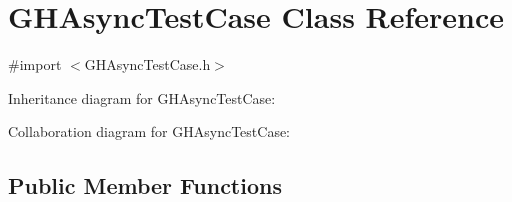 \hypertarget{interface_g_h_async_test_case}{
\section{\-G\-H\-Async\-Test\-Case \-Class \-Reference}
\label{interface_g_h_async_test_case}
}


{\ttfamily \#import $<$\-G\-H\-Async\-Test\-Case.\-h$>$}



\-Inheritance diagram for \-G\-H\-Async\-Test\-Case\-:


\-Collaboration diagram for \-G\-H\-Async\-Test\-Case\-:
\subsection*{\-Public \-Member \-Functions}

